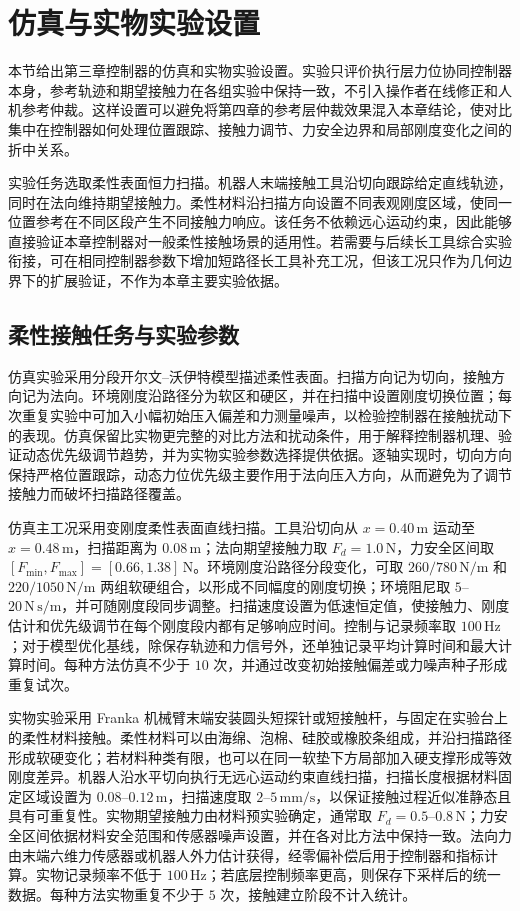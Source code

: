 \section{仿真与实物实验设置}
\label{sec:ch3_experiment_setup}

本节给出第三章控制器的仿真和实物实验设置。实验只评价执行层力位协同控制器本身，参考轨迹和期望接触力在各组实验中保持一致，不引入操作者在线修正和人机参考仲裁。这样设置可以避免将第四章的参考层仲裁效果混入本章结论，使对比集中在控制器如何处理位置跟踪、接触力调节、力安全边界和局部刚度变化之间的折中关系。

实验任务选取柔性表面恒力扫描。机器人末端接触工具沿切向跟踪给定直线轨迹，同时在法向维持期望接触力。柔性材料沿扫描方向设置不同表观刚度区域，使同一位置参考在不同区段产生不同接触力响应。该任务不依赖远心运动约束，因此能够直接验证本章控制器对一般柔性接触场景的适用性。若需要与后续长工具综合实验衔接，可在相同控制器参数下增加短路径长工具补充工况，但该工况只作为几何边界下的扩展验证，不作为本章主要实验依据。

\subsection{柔性接触任务与实验参数}
\label{subsec:ch3_task_setup}

仿真实验采用分段开尔文--沃伊特模型描述柔性表面。扫描方向记为切向，接触方向记为法向。环境刚度沿路径分为软区和硬区，并在扫描中设置刚度切换位置；每次重复实验中可加入小幅初始压入偏差和力测量噪声，以检验控制器在接触扰动下的表现。仿真保留比实物更完整的对比方法和扰动条件，用于解释控制器机理、验证动态优先级调节趋势，并为实物实验参数选择提供依据。逐轴实现时，切向方向保持严格位置跟踪，动态力位优先级主要作用于法向压入方向，从而避免为了调节接触力而破坏扫描路径覆盖。

仿真主工况采用变刚度柔性表面直线扫描。工具沿切向从 $x=0.40\,\mathrm{m}$ 运动至 $x=0.48\,\mathrm{m}$，扫描距离为 $0.08\,\mathrm{m}$；法向期望接触力取 $F_d=1.0\,\mathrm{N}$，力安全区间取 $[F_{\min},F_{\max}]=[0.66,1.38]\,\mathrm{N}$。环境刚度沿路径分段变化，可取 $260/780\,\mathrm{N/m}$ 和 $220/1050\,\mathrm{N/m}$ 两组软硬组合，以形成不同幅度的刚度切换；环境阻尼取 $5$--$20\,\mathrm{N\,s/m}$，并可随刚度段同步调整。扫描速度设置为低速恒定值，使接触力、刚度估计和优先级调节在每个刚度段内都有足够响应时间。控制与记录频率取 $100\,\mathrm{Hz}$；对于模型优化基线，除保存轨迹和力信号外，还单独记录平均计算时间和最大计算时间。每种方法仿真不少于 $10$ 次，并通过改变初始接触偏差或力噪声种子形成重复试次。

实物实验采用 Franka 机械臂末端安装圆头短探针或短接触杆，与固定在实验台上的柔性材料接触。柔性材料可以由海绵、泡棉、硅胶或橡胶条组成，并沿扫描路径形成软硬变化；若材料种类有限，也可以在同一软垫下方局部加入硬支撑形成等效刚度差异。机器人沿水平切向执行无远心运动约束直线扫描，扫描长度根据材料固定区域设置为 $0.08$--$0.12\,\mathrm{m}$，扫描速度取 $2$--$5\,\mathrm{mm/s}$，以保证接触过程近似准静态且具有可重复性。实物期望接触力由材料预实验确定，通常取 $F_d=0.5$--$0.8\,\mathrm{N}$；力安全区间依据材料安全范围和传感器噪声设置，并在各对比方法中保持一致。法向力由末端六维力传感器或机器人外力估计获得，经零偏补偿后用于控制器和指标计算。实物记录频率不低于 $100\,\mathrm{Hz}$；若底层控制频率更高，则保存下采样后的统一数据。每种方法实物重复不少于 $5$ 次，接触建立阶段不计入统计。

